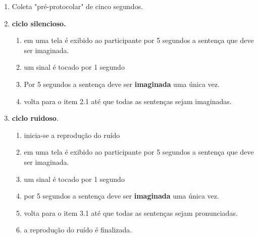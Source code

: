 \begin{frame}
{		\begin{enumerate}
			\item Coleta "pré-protocolar" de cinco segundos.	
			\item \textbf{ciclo silencioso.}
			\begin{enumerate}
				\item em uma tela é exibido ao participante por 5 segundos a sentença que deve ser imaginada.
				\item um sinal é tocado por 1 segundo
				\item Por 5 segundos a sentença deve ser \textbf{imaginada} uma única vez.
				\item volta para o item 2.1 até que todas as sentenças sejam imaginadas.
			\end{enumerate}
			\item \textbf{ciclo ruidoso}.
			\begin{enumerate}
				\item inicia-se a reprodução do ruído
				\item em uma tela é exibido ao participante por 5 segundos a sentença que deve ser imaginada.
				\item um sinal é tocado por 1 segundo
				\item por 5 segundos a sentença deve ser \textbf{imaginada} uma única vez.
				\item volta para o item 3.1 até que todas as sentenças sejam pronunciadas.
				\item a reprodução do ruído é finalizada.
			\end{enumerate}
		\end{enumerate}
	}
	


\end{frame}
